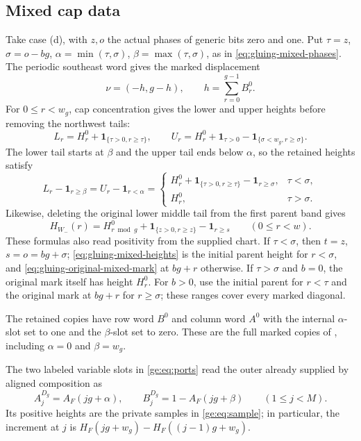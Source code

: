 \documentclass[11pt,a4paper]{amsart}
\numberwithin{equation}{section}
\theoremstyle{plain}
\theoremstyle{definition}
\begin{document}
\subsection{Mixed cap data}

Take case (d), with \(z,o\) the actual phases of generic bits zero
and one.  Put \(\tau=z\), \(\sigma=o-bg\),
\(\alpha=\min(\tau,\sigma)\), \(\beta=\max(\tau,\sigma)\), as in
\eqref{eq:gluing-mixed-phases}.  The periodic southeast word gives
the marked displacement
\[
 \nu=(-h,g-h),\qquad h=\sum_{r=0}^{g-1}B^0_r.
\]
For \(0\le r<w_g\), cap concentration gives the lower and upper
heights before removing the northwest tails:
\begin{equation*}
 L_r=H^0_r+\mathbf1_{\{\tau>0,r\ge\tau\}},\qquad
 U_r=H^0_r+\mathbf1_{\tau>0}-\mathbf1_{\{\sigma<w_g,r\ge\sigma\}}.
\end{equation*}
The lower tail starts at \(\beta\) and the upper tail ends below
\(\alpha\), so the retained heights satisfy
\begin{equation}\label{eq:gluing-mixed-heights}
 L_r-\mathbf1_{r\ge\beta}=U_r-\mathbf1_{r<\alpha}
 =\begin{cases}
 H^0_r+\mathbf1_{\{\tau>0,r\ge\tau\}}-\mathbf1_{r\ge\sigma},&\tau<\sigma,\\
 H^0_r,&\tau>\sigma.
 \end{cases}
\end{equation}
Likewise, deleting the original lower middle tail from the first
parent band gives
\begin{equation}\label{eq:gluing-original-mixed-mark}
 H_{W_-}(r)=H^0_{r\bmod g}
   +\mathbf1_{\{z>0,r\ge z\}}-\mathbf1_{r\ge s}
 \qquad(0\le r<w).
\end{equation}
These formulas also read positivity from the supplied chart.
If \(\tau<\sigma\), then \(t=z\), \(s=o=bg+\sigma\);
\eqref{eq:gluing-mixed-heights} is the initial parent height for
\(r<\sigma\), and \eqref{eq:gluing-original-mixed-mark} at
\(bg+r\) otherwise.  If \(\tau>\sigma\) and \(b=0\), the original
mark itself has height \(H^0_r\).  For \(b>0\), use the initial
parent for \(r<\tau\) and the original mark at \(bg+r\) for
\(r\ge\sigma\); these ranges cover every marked diagonal.

The retained copies have row word \(B^0\) and column word \(A^0\)
with the internal \(\alpha\)-slot set to one and the
\(\beta\)-slot set to zero.  These are the full marked copies of
, including \(\alpha=0\) and \(\beta=w_g\).

The two labeled variable slots in \eqref{ge:eq:ports} read the
outer already supplied by aligned composition as
\begin{equation}\label{eq:gluing-mixed-inverse}
 A^{D_g}_j=A_F(jg+\alpha),\qquad
 B^{D_g}_j=1-A_F(jg+\beta)\qquad(1\le j<M).
\end{equation}
Its positive heights are the private samples in \eqref{ge:eq:sample};
in particular, the increment at \(j\) is
\(H_F(jg+w_g)-H_F((j-1)g+w_g)\).
\end{document}
